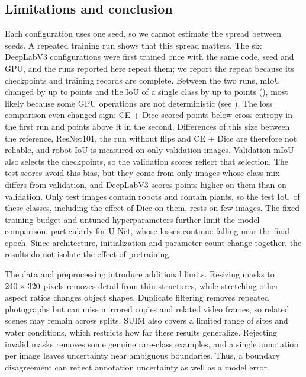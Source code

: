 \subsection{Limitations and conclusion}
\label{sec:conclusion}
Each configuration uses one seed, so we cannot estimate the spread between
seeds. A repeated training run shows that this spread matters. The six
DeepLabV3 configurations were first trained once with the same code, seed and
GPU, and the runs reported here repeat them; we report the repeat because its
checkpoints and training records are complete. Between the two runs, mIoU
changed by up to \repeatMaxMiouGap{} points and the IoU of a single class by up
to \repeatMaxClassGap{} points (\repeatMaxClassName{}), most likely because
some GPU operations are not deterministic (see ). The loss comparison even changed sign:
CE + Dice scored \repeatDiceDeltaFirst{} points below cross-entropy in the first
run and \diceDeltaMiou{} points above it in the second. Differences of this size
between the reference, ResNet101, the run without flips and CE + Dice are
therefore not reliable, and robot IoU is measured on only \suimImagesValRO{}
validation images. Validation mIoU also selects the checkpoints, so the
validation scores reflect that selection. The test scores avoid this bias, but
they come from only \testImages{} images whose class mix differs from
validation, and DeepLabV3 scores \deeplabCeValTestGap{} points higher on them
than on validation. Only \suimImagesTestRO{} test images contain robots and
\suimImagesTestPF{} contain plants, so the test IoU of these classes, including
the effect of Dice on them, rests on few images. The fixed training
budget and untuned hyperparameters further limit the model comparison,
particularly for U-Net, whose losses continue falling near the final epoch.
Since architecture, initialization and parameter count change together, the
results do not isolate the effect of pretraining.

The data and preprocessing introduce additional limits. Resizing masks to
$240\times320$ pixels removes detail from thin
structures, while stretching other aspect ratios changes object shapes.
Duplicate filtering removes repeated photographs but can miss mirrored copies
and related video frames, so related scenes may remain across splits. SUIM
also covers a limited range of sites and water conditions, which restricts how
far these results generalize. Rejecting invalid masks removes some genuine
rare-class examples, and a single annotation per image leaves uncertainty near
ambiguous boundaries. Thus, a boundary disagreement can reflect annotation
uncertainty as well as a model error.

